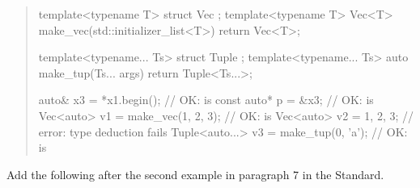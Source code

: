 \begin{quote}
\begin{addedblock}
\enterexample
\begin{codeblock}
template<typename T> struct Vec { };
template<typename T> Vec<T> make_vec(std::initializer_list<T>) { return Vec<T>{}; }

template<typename... Ts> struct Tuple { };
template<typename... Ts> auto make_tup(Ts... args) { return Tuple<Ts...>{}; }

auto& x3 = *x1.begin();               // OK:  is 
const auto* p = &x3;                  // OK:  is 
Vec<auto> v1 = make_vec({1, 2, 3});   // OK:  is 
Vec<auto> v2 = {1, 2, 3};             // error: type deduction fails
Tuple<auto...> v3 = make_tup(0, 'a'); // OK:  is 
\end{codeblock}
\exitexample
\end{addedblock}
\end{quote}

Add the following after the second example in paragraph 7 in the \Cpp Standard.

